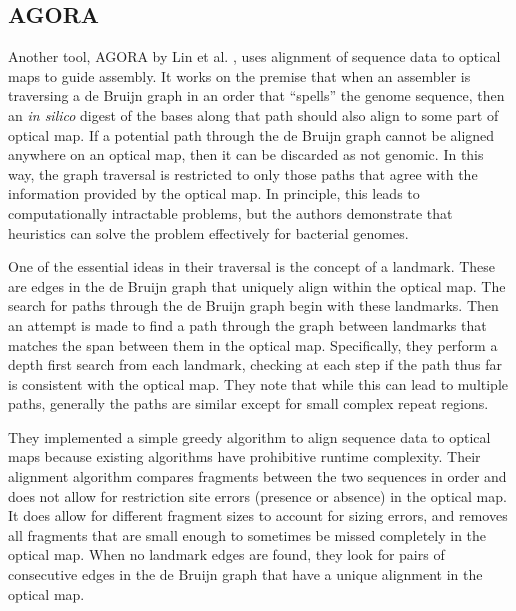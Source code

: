 \documentclass[doctor]{thesis}
\begin{document}




\subsection{AGORA}

Another tool, AGORA by Lin et al. \cite{lin2012agora}, uses alignment of sequence data to optical maps to guide assembly.
It works on the premise that when an assembler is traversing a de Bruijn graph in an order that “spells” the genome sequence, then an \emph{in silico} digest of the bases along that path should also align to some part of optical map.
If a potential path through the de Bruijn graph cannot be aligned anywhere on an optical map, then it can be discarded as not genomic.
In this way, the graph traversal is restricted to only those paths that agree with the information provided by the optical map.
In principle, this leads to computationally intractable problems, but the authors demonstrate that heuristics can solve the problem effectively for bacterial genomes.

One of the essential ideas in their traversal is the concept of a landmark.
These are edges in the de Bruijn graph that uniquely align within the optical map.
The search for paths through the de Bruijn graph begin with these landmarks.
Then an attempt is made to find a path through the graph between landmarks that matches the span between them in the optical map.
Specifically, they perform a depth first search from each landmark, checking at each step if the path thus far is consistent with the optical map.
They note that while this can lead to multiple paths, generally the paths are similar except for small complex repeat regions.


They implemented a simple greedy algorithm to align sequence data to optical maps because existing algorithms have prohibitive runtime complexity.
Their alignment algorithm compares fragments between the two sequences in order and does not allow for restriction site errors (presence or absence) in the optical map.
It does allow for different fragment sizes to account for sizing errors, and removes all fragments that are small enough to sometimes be missed completely in the optical map.
When no landmark edges are found, they look for pairs of consecutive edges in the de Bruijn graph that have a unique alignment in the optical map.
\end{document}
